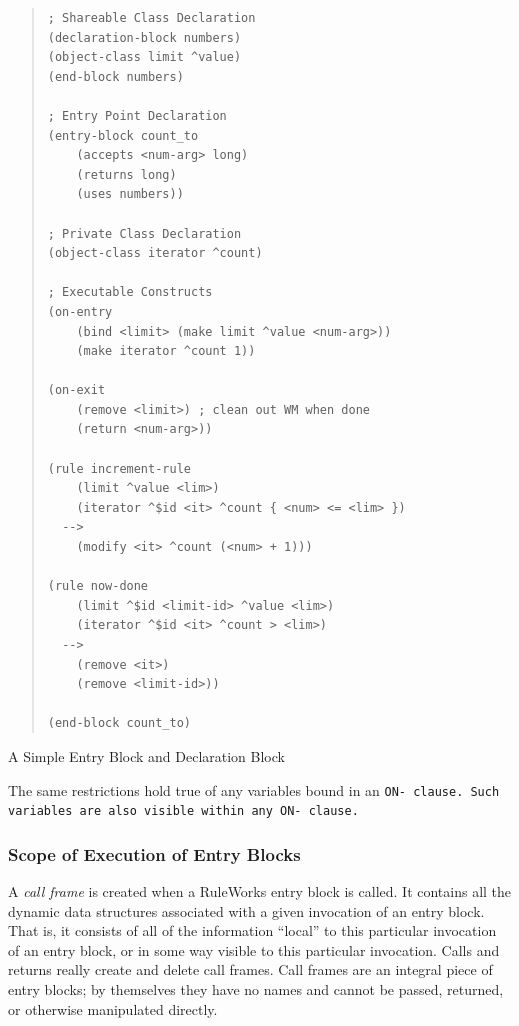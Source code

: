 \begin{example}[!h]
\begin{quote}
\begin{verbatim}
; Shareable Class Declaration
(declaration-block numbers)
(object-class limit ^value)
(end-block numbers)

; Entry Point Declaration
(entry-block count_to
    (accepts <num-arg> long)
    (returns long)
    (uses numbers))

; Private Class Declaration
(object-class iterator ^count)

; Executable Constructs
(on-entry
    (bind <limit> (make limit ^value <num-arg>))
    (make iterator ^count 1))

(on-exit
    (remove <limit>) ; clean out WM when done
    (return <num-arg>))

(rule increment-rule
    (limit ^value <lim>)
    (iterator ^$id <it> ^count { <num> <= <lim> })
  -->
    (modify <it> ^count (<num> + 1)))

(rule now-done
    (limit ^$id <limit-id> ^value <lim>)
    (iterator ^$id <it> ^count > <lim>)
  -->
    (remove <it>)
    (remove <limit-id>))

(end-block count_to)
\end{verbatim}
\end{quote}
\caption{A Simple Entry Block and Declaration Block}
\label{e:5-1}
\end{example}

The same restrictions hold true of any variables bound in an \tt{ON-}
clause. Such variables are also visible within any \tt{ON-} clause.

\subsubsection{Scope of Execution of Entry Blocks}

A \emph{call frame} is created when a RuleWorks entry block is
called. It contains all the dynamic data structures associated with a
given invocation of an entry block. That is, it consists of all of the
information ``local'' to this particular invocation of an entry block,
or in some way visible to this particular invocation. Calls and
returns really create and delete call frames. Call frames are an
integral piece of entry blocks; by themselves they have no names and
cannot be passed, returned, or otherwise manipulated directly.

